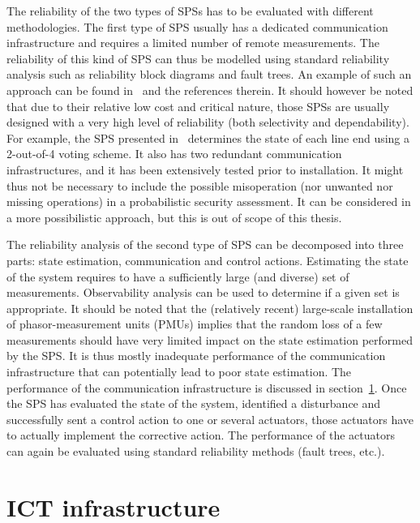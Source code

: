 The reliability of the two types of SPSs has to be evaluated with different methodologies. The first type of SPS usually has a dedicated communication infrastructure and requires a limited number of remote measurements. The reliability of this kind of SPS can thus be modelled using standard reliability analysis such as reliability block diagrams and fault trees. An example of such an approach can be found in~\cite{SPSreliabilityThesis} and the references therein. It should however be noted that due to their relative low cost and critical nature, those SPSs are usually designed with a very high level of reliability (both selectivity and dependability). For example, the SPS presented in~\cite{BelgiumSPS} determines the state of each line end using a 2-out-of-4 voting scheme. It also has two redundant communication infrastructures, and it has been extensively tested prior to installation. It might thus not be necessary to include the possible misoperation (nor unwanted nor missing operations) in a probabilistic security assessment. It can be considered in a more possibilistic approach, but this is out of scope of this thesis.

The reliability analysis of the second type of SPS can be decomposed into three parts: state estimation, communication and control actions. Estimating the state of the system requires to have a sufficiently large (and diverse) set of measurements. Observability analysis can be used to determine if a given set is appropriate. It should be noted that the (relatively recent) large-scale installation of phasor-measurement units (PMUs) implies that the random loss of a few measurements should have very limited impact on the state estimation performed by the SPS. It is thus mostly inadequate performance of the communication infrastructure that can potentially lead to poor state estimation. The performance of the communication infrastructure is discussed in section~\ref{sec:SPS-ICT}. Once the SPS has evaluated the state of the system, identified a disturbance and successfully sent a control action to one or several actuators, those actuators have to actually implement the corrective action. The performance of the actuators can again be evaluated using standard reliability methods (fault trees, etc.).

\section{ICT infrastructure}
\label{sec:SPS-ICT}

